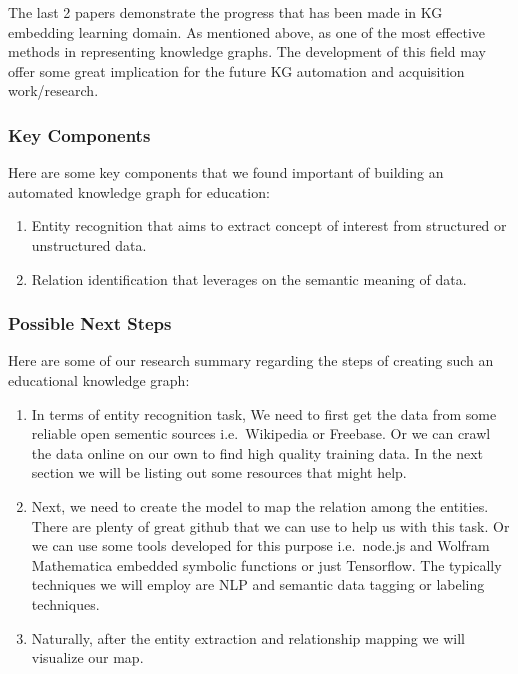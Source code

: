 \documentclass[]{book}
\theoremstyle{definition}
\theoremstyle{definition}
\theoremstyle{definition}
\theoremstyle{remark}
\begin{document}
The last 2 papers demonstrate the progress that has been made in KG
embedding learning domain. As mentioned above, as one of the most
effective methods in representing knowledge graphs. The development of
this field may offer some great implication for the future KG automation
and acquisition work/research.

\subsubsection{Key Components}\label{key-components}

Here are some key components that we found important of building an
automated knowledge graph for education:

\begin{enumerate}
\def\labelenumi{\arabic{enumi}.}
\item
  Entity recognition that aims to extract concept of interest from
  structured or unstructured data.
\item
  Relation identification that leverages on the semantic meaning of
  data.
\end{enumerate}

\subsubsection{Possible Next Steps}\label{possible-next-steps}

Here are some of our research summary regarding the steps of creating
such an educational knowledge graph:

\begin{enumerate}
\def\labelenumi{\arabic{enumi}.}
\item
  In terms of entity recognition task, We need to first get the data
  from some reliable open sementic sources i.e.~Wikipedia or Freebase.
  Or we can crawl the data online on our own to find high quality
  training data. In the next section we will be listing out some
  resources that might help.
\item
  Next, we need to create the model to map the relation among the
  entities. There are plenty of great github that we can use to help us
  with this task. Or we can use some tools developed for this purpose
  i.e.~node.js and Wolfram Mathematica embedded symbolic functions or
  just Tensorflow. The typically techniques we will employ are NLP and
  semantic data tagging or labeling techniques.
\item
  Naturally, after the entity extraction and relationship mapping we
  will visualize our map.
\end{enumerate}
\end{document}
